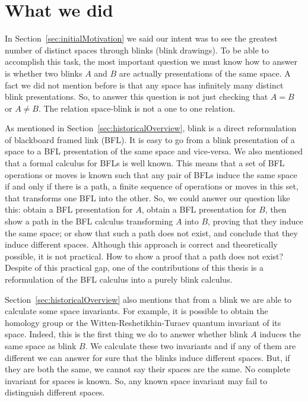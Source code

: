 \newpage

\section{What we did}

In Section~\ref{sec:initialMotivation} we said our intent was to see
the greatest number of distinct spaces through blinks (\ie blink drawings).
To be able to accomplish this task, the most important question we must know
how to answer is whether two blinks $A$ and $B$ are
actually presentations of the same space. A fact we did
not mention before is that any space has infinitely
many distinct blink presentations. So, to answer this question is
not just checking that $A = B$ or $A \neq B$. The relation
space-blink is not a one to one relation.

As mentioned in Section~\ref{sec:historicalOverview}, blink is a direct
reformulation of blackboard framed link (BFL). It is easy to go from a blink
presentation of a space to a BFL presentation of the same space and
vice-versa. We also mentioned that a formal calculus for BFLs is well
known. This
means that a set of BFL operations or moves is known such that any pair
of BFLs induce the same space if and only if there
is a path, \ie a finite sequence of operations or moves in this set, that
transforms one BFL into the other. So, we could answer our question like
this: obtain a BFL presentation for $A$, obtain a BFL presentation for
$B$, then show a path in the BFL calculus transforming $A$ into $B$, proving
that they induce the same space; or show that such a path does not exist, and
conclude that they induce different spaces. Although this approach is correct and theoretically
possible, it is not practical. How to show a proof that a path does not
exist? Despite of this practical gap, one of the contributions of
this thesis is a reformulation of the BFL calculus into a purely blink
calculus.%

Section~\ref{sec:historicalOverview} also mentions that from a blink we
are able to calculate some space invariants. For example, it is possible
to obtain the homology group or the Witten-Reshetikhin-Turaev
quantum invariant of its space. Indeed, this is the first thing we do
to answer whether blink $A$ induces the same space as blink $B$. We
calculate these two invariants and if any of them are different
we can answer for sure that the blinks induce different spaces. But,
if they are both the same, we cannot say their spaces are the same.
No complete invariant for spaces is known. So, any known space
invariant may fail to distinguish different spaces.

